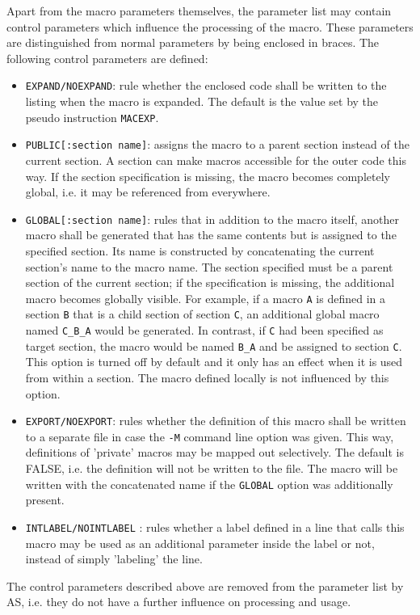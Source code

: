 \documentclass[12pt,twoside]{report}
\newcommand{\tty}[1]{{\tt #1}}
\begin{document}
Apart from the macro parameters themselves, the parameter list may
contain control parameters which influence the processing of the
macro.  These parameters are distinguished from normal parameters by
being enclosed in braces.  The following control parameters are
defined:
\begin{itemize}
\item{\tty{EXPAND/NOEXPAND}: rule whether the enclosed code shall
      be written to the listing when the macro is expanded.  The
      default is the value set by the pseudo instruction \tty{MACEXP}.}
\item{\tty{PUBLIC[:section name]}: assigns the macro to a parent section
      instead of the current section.  A section can make macros
      accessible for the outer code this way.  If the section
      specification is missing, the macro becomes completely global, i.e.
      it may be referenced from everywhere.}
\item{\tty{GLOBAL[:section name]}: rules that in addition to the macro
      itself, another macro shall be generated that has the same contents
      but is assigned to the specified section.  Its name is constructed by
      concatenating the current section's name to the macro name.  The
      section specified must be a parent section of the current section;
      if the specification is missing, the additional macro becomes
      globally visible.  For example, if a macro \tty{A} is defined in a
      section \tty{B} that is a child section of section \tty{C}, an additional
      global macro named \tty{C\_B\_A} would be generated.  In contrast, if
      \tty{C} had been specified as target section, the macro would be named \tty{B\_A}
      and be assigned to section \tty{C}.  This option is turned off by default
      and it only has an effect when it is used from within a section. 
      The macro defined locally is not influenced by this option.}
\item{\tty{EXPORT/NOEXPORT}: rules whether the definition of this macro
      shall be written to a separate file in case the \tty{-M} command line
      option was given.  This way, definitions of 'private' macros may
      be mapped out selectively.  The default is FALSE, i.e. the
      definition will not be written to the file.  The macro will be
      written with the concatenated name if the \tty{GLOBAL} option was
      additionally present.}
\item{\tty{INTLABEL/NOINTLABEL} : rules whether a label defined in a line 
      that calls this macro may be used as an additional parameter inside
      the label or not, instead of simply 'labeling' the line.}
\end{itemize}
The control parameters described above are removed from the parameter
list by AS, i.e. they do not have a further influence on processing
and usage.
\end{document}
